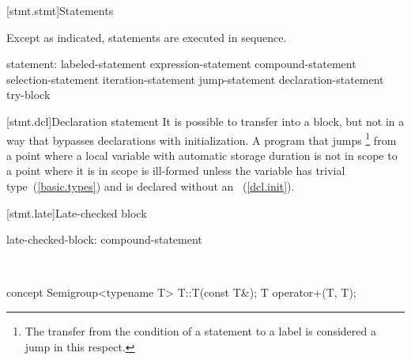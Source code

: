 \documentclass[american]{book}
\begin{document}
[stmt.stmt]{Statements}

\begin{paras}

\pnum
{}%
\textcolor{black}{}Except as indicated, statements are executed in sequence.
%

\begin{bnf}
%
statement:\br
    labeled-statement\br
    expression-statement\br
    compound-statement\br
    selection-statement\br
    iteration-statement\br
    jump-statement\br
    declaration-statement\br
    try-block\br
\end{bnf}

\setcounter{section}{6}
[stmt.dcl]{Declaration statement}
\setcounter{Paras}{2}
\pnum
{}%
%
It is possible to transfer into a block, but not in a way that bypasses
declarations with initialization. A program that jumps%
\footnote{%
The transfer from the condition of a  statement to a
 label is considered a jump in this respect.%
}
from a point where a local variable with automatic storage duration is
not in scope to a point where it is in scope is ill-formed unless the
variable has
trivial type~(\ref{basic.types}) and is declared without an
~(\ref{dcl.init}).


\color{addclr}
\setcounter{section}{8}
[stmt.late]{Late-checked block}

\pnum
{}
\addedConcepts{ \mbox{\exitnote}} 
  
\begin{bnf}
late-checked-block:\br
     compound-statement
\end{bnf}

\pnum
\enterexample\
\begin{codeblock}
concept Semigroup<typename T> {
  T::T(const T&);
  T operator+(T, T);
}


\end{codeblock}
\end{paras}
\end{document}
